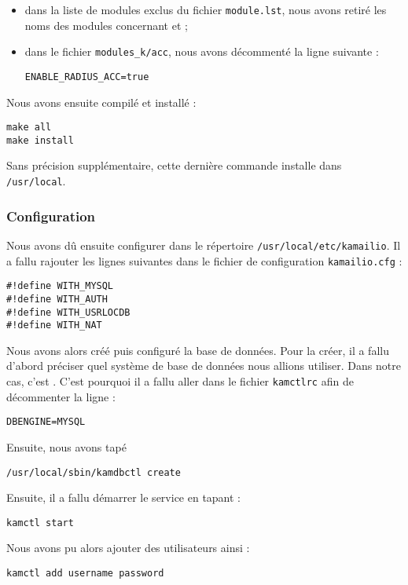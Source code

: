 \begin{itemize}
	\item{dans la liste de modules exclus du fichier \texttt{module.lst}, nous avons retiré les noms des modules concernant {\my} et {\rad}} ;
	\item{dans le fichier \texttt{modules\_k/acc}, nous avons décommenté la ligne suivante :
\begin{verbatim}
ENABLE_RADIUS_ACC=true
\end{verbatim}}
\end{itemize}

Nous avons ensuite compilé et installé {\kam} :

\begin{verbatim}
make all
make install
\end{verbatim}

Sans précision supplémentaire, cette dernière commande installe {\kam} dans \texttt{/usr/local}.

\subsubsection{Configuration}

Nous avons dû ensuite configurer {\kam} dans le répertoire \texttt{/usr/local/etc/kamailio}. Il a fallu rajouter les lignes suivantes dans le fichier de configuration \texttt{kamailio.cfg} :

\begin{verbatim}
#!define WITH_MYSQL
#!define WITH_AUTH
#!define WITH_USRLOCDB
#!define WITH_NAT
\end{verbatim}

Nous avons alors créé puis configuré la base de données. Pour la créer, il a fallu d'abord préciser quel système de base de données nous allions utiliser. Dans notre cas, c'est \my. C'est pourquoi il a fallu aller dans le fichier \texttt{kamctlrc} afin de décommenter la ligne :

\begin{verbatim}
DBENGINE=MYSQL
\end{verbatim}

Ensuite, nous avons tapé 
\begin{verbatim}
/usr/local/sbin/kamdbctl create
\end{verbatim}

Ensuite, il a fallu démarrer le service en tapant :

\begin{verbatim}
kamctl start
\end{verbatim}

Nous avons pu alors ajouter des utilisateurs ainsi :

\begin{verbatim}
kamctl add username password
\end{verbatim}
